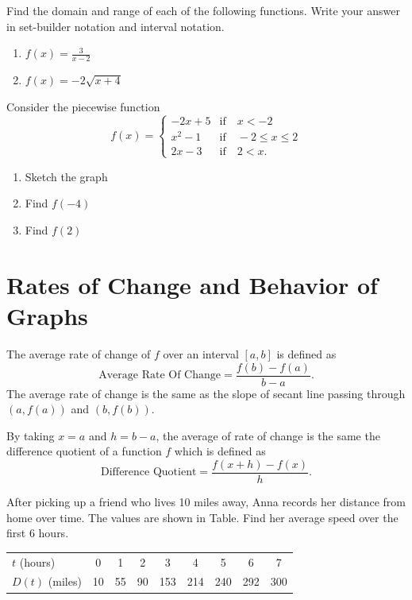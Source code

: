 \newpage

\begin{exercise}
  Find the domain and range of each of the following functions. Write your answer in set-builder notation and interval notation.
  \begin{enumerate}[twocol]
    \item $f(x)=\frac{3}{x-2}$
    \item $f(x)=-2\sqrt{x+4}$
  \end{enumerate}
\end{exercise}

\begin{exercise}
  Consider the piecewise function
  $$f(x)=\begin{cases}
    -2x+5 & \text{if}\quad x< -2\\
    x^2-1 & \text{if}\quad -2\le x\le 2\\
    2x-3 & \text{if}\quad 2< x.
  \end{cases}$$
  \begin{enumerate}[threecol]
    \item Sketch the graph
    \item Find $f(-4)$
    \item Find $f(2)$
  \end{enumerate}
\end{exercise}

\newpage

\section{Rates of Change and Behavior of Graphs}

\begin{definition}
  The average rate of change of $f$ over an interval $[a,b]$ is defined as
  $$\text{Average Rate Of Change}=\dfrac{f(b)-f(a)}{b-a}.$$
  The average rate of change is the same as the slope of secant line passing through $(a, f(a))$ and $(b, f(b))$.
  
  By taking $x=a$ and $h=b-a$, the average of rate of change is the same the difference quotient of a function $f$ which is defined as
  $$\text{Difference Quotient}=\dfrac{f(x+h)-f(x)}{h}.$$
\end{definition}

\begin{example}
  After picking up a friend who lives 10 miles away, Anna records her distance from home over time. The values are shown in Table. Find her average speed over the first 6 hours.
\begin{center}
  \begin{tabular}{l*{8}{c}}
    $t$ (hours) & 0 & 1 & 2 & 3 & 4 & 5 & 6 & 7\\
    $D(t)$ (miles) & 10 & 55 & 90 & 153 & 214 & 240 & 292 & 300
  \end{tabular}
\end{center}
\end{example}

